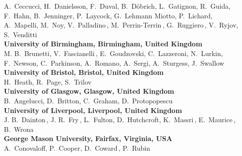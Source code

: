 \begin{raggedright}
 A.~Ceccucci,
 H.~Danielsson,
 F.~Duval,
 B.~D\"obrich,
 L.~Gatignon,
 R.~Guida,
 F.~Hahn,
 B.~Jenninger,
 P.~Laycock,
 G.~Lehmann Miotto,
 P.~Lichard,
 A.~Mapelli,
 M.~Noy,
 V.~Palladino$\,$\footnotemark[19],
 M.~Perrin-Terrin$\,$\footnotemark[17],
 G.~Ruggiero$\,$\footnotemark[20],
 V.~Ryjov,
 S.~Venditti\\[2mm]
{\bf University of Birmingham, Birmingham, United Kingdom}\\
 M. B.~Brunetti,
 V.~Fascianelli$\,$\footnotemark[21],
 E.~Goudzovski,
 C.~Lazzeroni,
 N.~Lurkin,
 F.~Newson,
 C.~Parkinson,
 A.~Romano,
 A.~Sergi,
 A.~Sturgess,
 J.~Swallow\\[2mm]
{\bf University of Bristol, Bristol, United Kingdom}\\
 H.~Heath,
 R.~Page,
 S.~Trilov\\[2mm]
{\bf University of Glasgow, Glasgow, United Kingdom}\\
 B.~Angelucci,
 D.~Britton,
 C.~Graham,
 D.~Protopopescu\\[2mm]
{\bf University of Liverpool, Liverpool, United Kingdom}\\
 J. B.~Dainton$\,$\footnotemark[20],
 J. R.~Fry$\,$\footnotemark[9],
 L.~Fulton,
 D.~Hutchcroft,
 K.~Massri$\,$\footnotemark[7],
 E.~Maurice$\,$\footnotemark[22],
 B.~Wrona\\[2mm]
{\bf George Mason University, Fairfax, Virginia, USA}\\
 A.~Conovaloff,
 P.~Cooper,
 D.~Coward$\,$\footnotemark[23],
 P.~Rubin\\[2mm]
\end{raggedright}
%
%
\setcounter{footnote}{0}
\renewcommand{\thefootnote}{\fnsymbol{footnote}}
\renewcommand{\thefootnote}{\arabic{footnote}}
%
%
%
%
%
%
%
